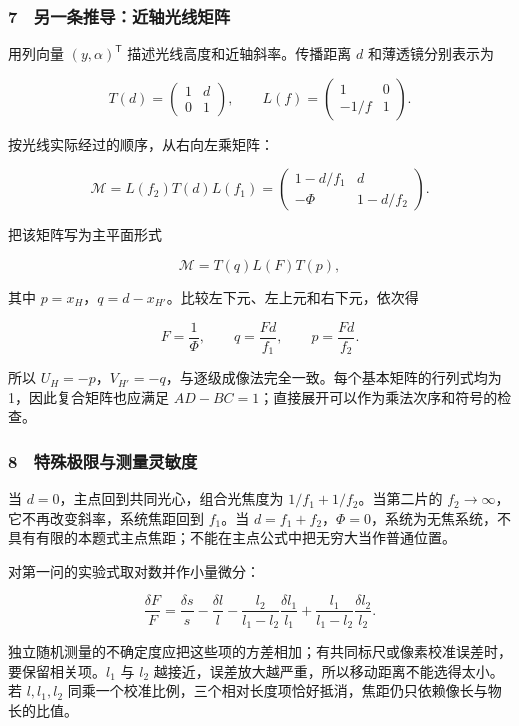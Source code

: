 \documentclass[12pt,a4paper,fontset=fandol]{ctexart}
\begin{document}
\subsubsection{7　另一条推导：近轴光线矩阵}\label{ux53e6ux4e00ux6761ux63a8ux5bfcux8fd1ux8f74ux5149ux7ebfux77e9ux9635}

用列向量 \((y,\alpha)^{\mathsf T}\) 描述光线高度和近轴斜率。传播距离
\(d\) 和薄透镜分别表示为

\[T(d)=\begin{pmatrix}1&d\\0&1\end{pmatrix},\qquad
L(f)=\begin{pmatrix}1&0\\-1/f&1\end{pmatrix}.\]

按光线实际经过的顺序，从右向左乘矩阵：

\[\mathcal M=L(f_2)T(d)L(f_1)
=\begin{pmatrix}
1-d/f_1&d\\
-\Phi&1-d/f_2
\end{pmatrix}.\]

把该矩阵写为主平面形式

\[\mathcal M=T(q)L(F)T(p),\]

其中 \(p=x_H\)，\(q=d-x_{H'}\)。比较左下元、左上元和右下元，依次得

\[F=\frac1\Phi,\qquad q=\frac{Fd}{f_1},\qquad
p=\frac{Fd}{f_2}.\]

所以
\(U_H=-p\)，\(V_{H'}=-q\)，与逐级成像法完全一致。每个基本矩阵的行列式均为1，因此复合矩阵也应满足
\(AD-BC=1\)；直接展开可以作为乘法次序和符号的检查。

\subsubsection{8　特殊极限与测量灵敏度}\label{ux7279ux6b8aux6781ux9650ux4e0eux6d4bux91cfux7075ux654fux5ea6}

当 \(d=0\)，主点回到共同光心，组合光焦度为 \(1/f_1+1/f_2\)。当第二片的
\(f_2\to\infty\)，它不再改变斜率，系统焦距回到 \(f_1\)。当
\(d=f_1+f_2\)，\(\Phi=0\)，系统为无焦系统，不具有有限的本题式主点焦距；不能在主点公式中把无穷大当作普通位置。

对第一问的实验式取对数并作小量微分：

\[\frac{\delta F}{F}
=\frac{\delta s}{s}-\frac{\delta l}{l}
-\frac{l_2}{l_1-l_2}\frac{\delta l_1}{l_1}
+\frac{l_1}{l_1-l_2}\frac{\delta l_2}{l_2}.\]

独立随机测量的不确定度应把这些项的方差相加；有共同标尺或像素校准误差时，要保留相关项。\(l_1\)
与 \(l_2\) 越接近，误差放大越严重，所以移动距离不能选得太小。若
\(l,l_1,l_2\)
同乘一个校准比例，三个相对长度项恰好抵消，焦距仍只依赖像长与物长的比值。
\end{document}
